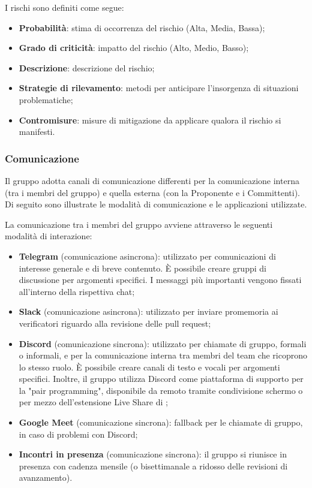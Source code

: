 \par I rischi sono definiti come segue:
\begin{itemize}
  \item \textbf{Probabilità}: stima di occorrenza del rischio (Alta, Media, Bassa);
  \item \textbf{Grado di criticità}: impatto del rischio (Alto, Medio, Basso);
  \item \textbf{Descrizione}: descrizione del rischio;
  \item \textbf{Strategie di rilevamento}: metodi per anticipare l'insorgenza di situazioni problematiche;
  \item \textbf{Contromisure}: misure di mitigazione da applicare qualora il rischio si manifesti.
\end{itemize}

\subsubsection{Comunicazione}
\par Il gruppo adotta canali di comunicazione differenti per la comunicazione interna (tra i membri del gruppo) e quella esterna (con la Proponente e i Committenti). Di seguito sono illustrate le modalità di comunicazione e le applicazioni utilizzate.

\par La comunicazione tra i membri del gruppo avviene attraverso le seguenti modalità di interazione:
\begin{itemize}
  \item \textbf{Telegram} (comunicazione asincrona): utilizzato per comunicazioni di interesse generale e di breve contenuto. È possibile creare gruppi di discussione per argomenti specifici. I messaggi più importanti vengono fissati all'interno della rispettiva chat;
  \item \textbf{Slack} (comunicazione asincrona): utilizzato per inviare promemoria ai verificatori riguardo alla revisione delle pull request;
  \item \textbf{Discord} (comunicazione sincrona): utilizzato per chiamate di gruppo, formali o informali, e per la comunicazione interna tra membri del team che ricoprono lo stesso ruolo. È possibile creare canali di testo e vocali per argomenti specifici. Inoltre, il gruppo utilizza Discord come piattaforma di supporto per la "pair programming", disponibile da remoto tramite condivisione schermo o per mezzo dell'estensione Live Share di ;
  \item \textbf{Google Meet} (comunicazione sincrona): fallback per le chiamate di gruppo, in caso di problemi con Discord;
  \item \textbf{Incontri in presenza} (comunicazione sincrona): il gruppo si riunisce in presenza con cadenza mensile (o bisettimanale a ridosso delle revisioni di avanzamento).
\end{itemize}

